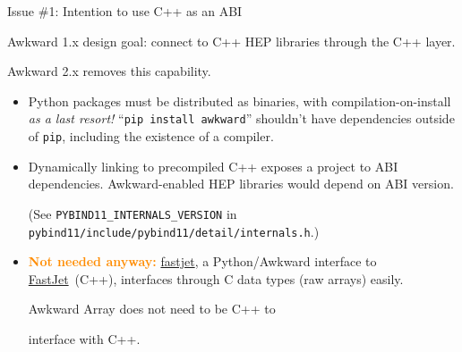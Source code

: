 \documentclass[aspectratio=169]{beamer}
\begin{document}
\begin{frame}{Issue \#1: Intention to use C++ as an ABI}
\large

\vspace{0.5 cm}
Awkward 1.x design goal: connect to C++ HEP libraries through the C++ layer.

\vspace{0.25 cm}
Awkward 2.x removes this capability.

\vspace{0.25 cm}
\begin{itemize}\setlength{\itemsep}{0.25 cm}
\item<2-> Python packages must be distributed as binaries, with compilation-on-install {\it as a last resort!} ``\texttt{pip install awkward}'' shouldn't have dependencies outside of \texttt{pip}, including the existence of a compiler.

\item<3-> Dynamically linking to precompiled C++ exposes a project to ABI dependencies. Awkward-enabled HEP libraries would depend on ABI version.

{\scriptsize (See \texttt{PYBIND11_INTERNALS_VERSION} in \texttt{pybind11/include/pybind11/detail/internals.h}.)}

\item<4-> \textcolor{darkorange}{\bf Not needed anyway:} \textcolor{blue}{\href{https://github.com/scikit-hep/fastjet}{fastjet}}, a Python/Awkward interface to \mbox{\textcolor{blue}{\href{http://fastjet.fr/}{FastJet}} (C++),\hspace{-0.5 cm}} interfaces through C data types (raw arrays) easily.

\vspace{0.25 cm}
Awkward Array does not need to be C++ to

interface with C++.
\end{itemize}

\vspace{-1.65 cm}
\hfill {}

\vspace{-0.15 cm}
\hfill {}
\end{frame}
\end{document}
